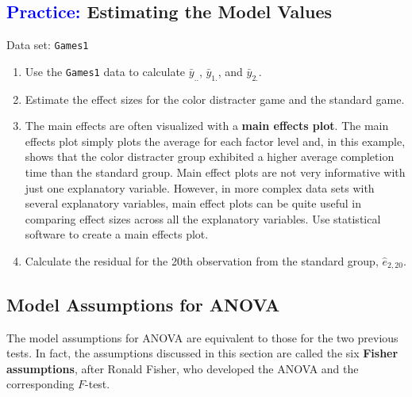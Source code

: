 \documentclass[
]{report}
\begin{document}
\hypertarget{estimating-the-model-values}{%
\subsection*{\texorpdfstring{\textcolor{blue}{Practice:} Estimating the Model Values}{ Estimating the Model Values}}\label{estimating-the-model-values}}

\vspace{-1em}

Data set: \texttt{Games1}

\begin{enumerate}
\def\labelenumi{\arabic{enumi}.}
\setcounter{enumi}{18}
\item
  Use the \texttt{Games1} data to calculate \(\scriptstyle \bar{y}_{..}\), \(\scriptstyle \bar{y}_{1.}\), and \(\scriptstyle \bar{y}_{2.}\).
\item
  Estimate the effect sizes for the color distracter game and the standard game.
\item
  The main effects are often visualized with a \textbf{main effects plot}. The main effects plot simply plots the average for each factor level and, in this example, shows that the color distracter group exhibited a higher average completion time than the standard group. Main effect plots are not very informative with just one explanatory variable. However, in more complex data sets with several explanatory variables, main effect plots can be quite useful in comparing effect sizes across all the explanatory variables. Use statistical software to create a main effects plot.
\item
  Calculate the residual for the 20th observation from the standard group, \(\scriptstyle \hat{e}_{2, 20}\).
\end{enumerate}

\hypertarget{model-assumptions-for-anova}{%
\subsection*{Model Assumptions for ANOVA}\label{model-assumptions-for-anova}}

The model assumptions for ANOVA are equivalent to those for the two previous tests. In fact, the assumptions discussed in this section are called the six \textbf{Fisher assumptions}, after Ronald Fisher, who developed the ANOVA and the corresponding \(\scriptstyle F\)-test.
\vspace{-1em}
\end{document}
